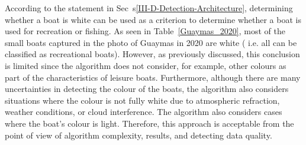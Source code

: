 According to the statement in Sec~s\ref{III-D-Detection-Architecture}, determining whether a boat is white can be used as a criterion to determine whether a boat is used for recreation or fishing. As seen in Table~\ref{Guaymas_2020}, most of the small boats captured in the photo of Guaymas in 2020 are white ( i.e. all can be classified as recreational boats). However, as previously discussed, this conclusion is limited since the algorithm does not consider, for example, other colours as part of the characteristics of leisure boats. Furthermore, although there are many uncertainties in detecting the colour of the boats, the algorithm also considers situations where the colour is not fully white due to atmospheric refraction, weather conditions, or cloud interference. The algorithm also considers cases where the boat's colour is light. Therefore, this approach is acceptable from the point of view of algorithm complexity, results, and detecting data quality.